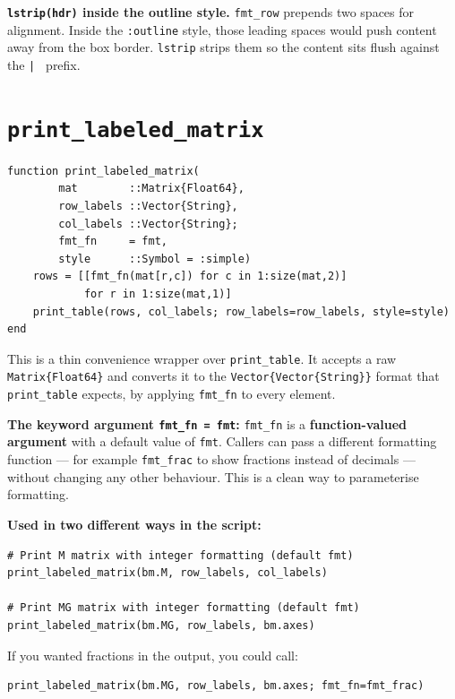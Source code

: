 \documentclass[12pt, a4paper]{article}
\newcommand{\cd}[1]{\texttt{#1}}
\begin{document}
\begin{notebox}
\textbf{\cd{lstrip(hdr)} inside the outline style.}
\cd{fmt\_row} prepends two spaces for alignment.
Inside the \cd{:outline} style, those leading spaces would
push content away from the box border.
\cd{lstrip} strips them so the content sits flush
against the \cd{| } prefix.
\end{notebox}


\section{\texttt{print\_labeled\_matrix}}

\begin{verbatim}
function print_labeled_matrix(
        mat        ::Matrix{Float64},
        row_labels ::Vector{String},
        col_labels ::Vector{String};
        fmt_fn     = fmt,
        style      ::Symbol = :simple)
    rows = [[fmt_fn(mat[r,c]) for c in 1:size(mat,2)]
            for r in 1:size(mat,1)]
    print_table(rows, col_labels; row_labels=row_labels, style=style)
end
\end{verbatim}

This is a thin convenience wrapper over \cd{print\_table}.
It accepts a raw \cd{Matrix\{Float64\}} and converts it to
the \cd{Vector\{Vector\{String\}\}} format that \cd{print\_table}
expects, by applying \cd{fmt\_fn} to every element.

\textbf{The keyword argument \cd{fmt\_fn = fmt}:}
\cd{fmt\_fn} is a \textbf{function-valued argument} with a
default value of \cd{fmt}.
Callers can pass a different formatting function ---
for example \cd{fmt\_frac} to show fractions instead of decimals ---
without changing any other behaviour.
This is a clean way to parameterise formatting.

\begin{examplebox}
\textbf{Used in two different ways in the script:}

\begin{verbatim}
# Print M matrix with integer formatting (default fmt)
print_labeled_matrix(bm.M, row_labels, col_labels)

# Print MG matrix with integer formatting (default fmt)
print_labeled_matrix(bm.MG, row_labels, bm.axes)
\end{verbatim}

If you wanted fractions in the output, you could call:
\begin{verbatim}
print_labeled_matrix(bm.MG, row_labels, bm.axes; fmt_fn=fmt_frac)
\end{verbatim}
\end{examplebox}
\end{document}

